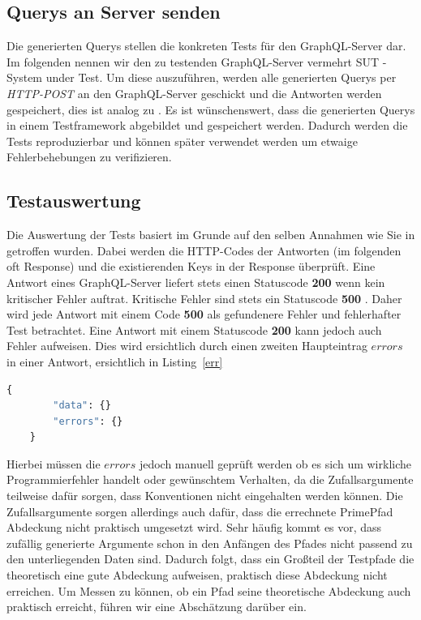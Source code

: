 \subsection{Querys an Server senden}
\label{testf}

Die generierten Querys stellen die konkreten Tests für den GraphQL-Server dar.
Im folgenden nennen wir den zu testenden GraphQL-Server vermehrt SUT - System under Test.
Um diese auszuführen, werden alle generierten Querys per \textit{HTTP-POST} an den GraphQL-Server geschickt und die Antworten
werden gespeichert, dies ist analog zu \cite{property-based-testing}.
Es ist wünschenswert, dass die generierten Querys in einem Testframework abgebildet und gespeichert werden.
Dadurch werden die Tests reproduzierbar und können später verwendet werden um etwaige Fehlerbehebungen zu verifizieren.

\subsection{Testauswertung}

Die Auswertung der Tests basiert im Grunde auf den selben Annahmen wie Sie in \cite{property-based-testing} getroffen wurden.
Dabei werden die HTTP-Codes der Antworten (im folgenden oft Response) und die existierenden Keys in der Response überprüft.
Eine Antwort eines GraphQL-Server liefert stets einen Statuscode \textbf{200} wenn kein kritischer Fehler auftrat.
Kritische Fehler sind stets ein Statuscode \textbf{500} \cite[vgl. 7. Response]{graphqlspecification}.
Daher wird jede Antwort mit einem Code \textbf{500} als gefundenere Fehler und fehlerhafter Test betrachtet.
Eine Antwort mit einem Statuscode \textbf{200} kann jedoch auch Fehler aufweisen.
Dies wird ersichtlich durch einen zweiten Haupteintrag $errors$ in einer Antwort, ersichtlich in Listing~\ref{err}

\begin{lstlisting}[language=GraphQL, label={err}, caption={fehlerhafte Antwort}]
    {
        "data": {}
        "errors": {}
    }
\end{lstlisting}

Hierbei müssen die $errors$ jedoch manuell geprüft werden ob es sich um wirkliche Programmierfehler handelt oder gewünschtem Verhalten,
da die Zufallsargumente teilweise dafür sorgen, dass Konventionen nicht eingehalten werden können.
Die Zufallsargumente sorgen allerdings auch dafür, dass die errechnete PrimePfad Abdeckung nicht praktisch umgesetzt wird.
Sehr häufig kommt es vor, dass zufällig generierte Argumente schon in den Anfängen des Pfades nicht passend zu den unterliegenden Daten sind.
Dadurch folgt, dass ein Großteil der Testpfade die theoretisch eine gute Abdeckung aufweisen, praktisch diese Abdeckung nicht erreichen.
Um Messen zu können, ob ein Pfad seine theoretische Abdeckung auch praktisch erreicht, führen wir eine Abschätzung darüber ein.

